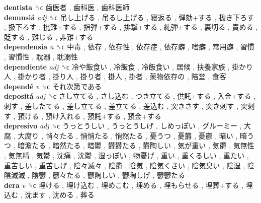 \textbf{dentista} ␝ϲ   歯医者 ,  歯科医 ,  歯科医師   \\
\textbf{denunsiá} \emph{adj}  ␝ϲ   吊し上げる ,  吊るし上げる ,  寝返る ,  弾劾+する ,  扱き下ろす ,  扱下ろす ,  批難+する ,  指弾+する ,  排撃+する ,  糺弾+する ,  裏切る ,  責める ,  貶する ,  難じる ,  非難+する   \\
\textbf{dependensia} \emph{n}  ␝ϲ   中毒 ,  依存 ,  依存性 ,  依存症 ,  依存癖 ,  嗜癖 ,  常用癖 ,  習慣 ,  習慣性 ,  耽溺 ,  耽溺性   \\
\textbf{dependiente} \emph{adj}  ␝ϲ   冷や飯食い ,  冷飯食 ,  冷飯食い ,  居候 ,  扶養家族 ,  掛かり人 ,  掛かり者 ,  掛り人 ,  掛り者 ,  掛人 ,  掛者 ,  薬物依存の ,  陪堂 ,  食客   \\
\textbf{dependé} \emph{v}  ␝ϲ   それ次第である   \\
\textbf{depositá} \emph{adj}  ␝ϲ   さし立てる ,  さし込む ,  つき立てる ,  供託+する ,  入金+する ,  刺す ,  差したてる ,  差し立てる ,  差立てる ,  差込む ,  突きさす ,  突き刺す ,  突刺す ,  預ける ,  預け入れる ,  預託+する ,  預金+する   \\
\textbf{depresivo} \emph{adj}  ␝ϲ   うっとうしい ,  うっとうしげ ,  しめっぽい ,  グルーミー ,  大腐 ,  大腐り ,  悄々たる ,  悄悄たる ,  悄然たる ,  憂うつ ,  憂欝 ,  憂鬱 ,  暗い ,  暗うつ ,  暗澹たる ,  暗然たる ,  暗鬱 ,  欝欝たる ,  欝陶しい ,  気が重い ,  気欝 ,  気無性 ,  気無精 ,  気鬱 ,  沈痛 ,  沈鬱 ,  湿っぽい ,  物憂げ ,  重い ,  重くるしい ,  重たい ,  重苦しい ,  重苦しげ ,  陰々滅々 ,  陰欝 ,  陰気 ,  陰気くさい ,  陰気臭い ,  陰湿 ,  陰陰滅滅 ,  陰鬱 ,  鬱々たる ,  鬱陶しい ,  鬱陶しげ ,  鬱鬱たる   \\
\textbf{dera} \emph{v}  ␝ϲ   埋ける ,  埋け込む ,  埋めこむ ,  埋める ,  埋もらせる ,  埋葬+する ,  埋込む ,  沈ます ,  沈める ,  葬る   \\
